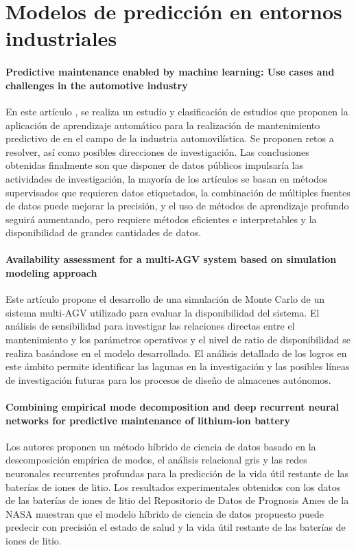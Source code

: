 \section{Modelos de predicción en entornos industriales}

\paragraph{Predictive maintenance enabled by machine learning: Use cases and challenges in the automotive industry}
En este artículo \cite{THEISSLER2021107864}, se realiza un estudio y clasificación de estudios que proponen la aplicación de aprendizaje 
automático para la realización de mantenimiento predictivo de en el campo de la industria automovilística.
Se proponen retos a resolver, así como posibles direcciones de investigación. Las conclusiones obtenidas finalmente 
son que disponer de datos públicos impulsaría las actividades de investigación, la mayoría de los artículos se basan 
en métodos supervisados que requieren datos etiquetados, la combinación de múltiples fuentes de datos puede 
mejorar la precisión, y el uso de métodos de aprendizaje profundo seguirá aumentando, pero requiere métodos 
eficientes e interpretables y la disponibilidad de grandes cantidades de datos.

\paragraph{Availability assessment for a multi-AGV system based on simulation modeling approach}
Este artículo \cite{9590979} propone el desarrollo de una simulación de Monte Carlo de un sistema multi-AGV 
utilizado para evaluar la disponibilidad del sistema. El análisis de sensibilidad para investigar las relaciones 
directas entre el mantenimiento y los parámetros operativos y el nivel de ratio de disponibilidad se 
realiza basándose en el modelo desarrollado. El análisis detallado de los logros en este ámbito permite 
identificar las lagunas en la investigación y las posibles líneas de investigación futuras para los 
procesos de diseño de almacenes autónomos.

\paragraph{Combining empirical mode decomposition and deep recurrent neural networks for predictive maintenance of lithium-ion battery}
Los autores proponen \cite{CHEN2021101405} un método híbrido de ciencia de datos basado en la descomposición empírica de modos, el análisis relacional gris 
y las redes neuronales recurrentes profundas para la predicción de la vida útil restante de las baterías de iones de litio.
Los resultados experimentales obtenidos con los datos de las baterías de iones de litio del Repositorio de 
Datos de Prognosis Ames de la NASA muestran que el modelo híbrido de ciencia de datos propuesto puede 
predecir con precisión el estado de salud y la vida útil restante de las baterías de iones de litio.

